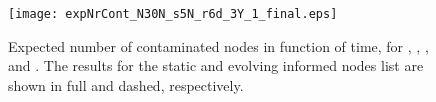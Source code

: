 \begin{figure}[tbp]
\centering
\texttt{[image: expNrCont\_N30N\_s5N\_r6d\_3Y\_1\_final.eps]}
\caption{Expected number of contaminated nodes in function of time, for , , ,  and . The results for the static and evolving informed nodes list are shown in full and dashed, respectively.}
\label{fig:exp}
\vspace{-0.4cm}
\end{figure}

